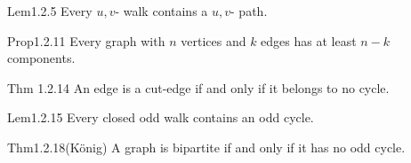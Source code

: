 \documentclass[dvipdfmx, leqno]{jsreport}
\begin{document}
\begin{soupractice}{Lem1.2.5}
    Every $u, v$- walk contains a $u, v$- path.
\end{soupractice}


\begin{soupractice}{Prop1.2.11}
    Every graph with $n$ vertices and $k$ edges has at least $n- k$ components.
\end{soupractice}

\begin{soupractice}{Thm 1.2.14}
    An edge is a cut-edge if and only if it belongs to no cycle.
\end{soupractice}

\begin{soupractice}{Lem1.2.15}
    Every closed odd walk contains an odd cycle.
\end{soupractice}

\begin{soupractice}{Thm1.2.18(K\"onig)}
    A graph is bipartite if and only if it has no odd cycle.
\end{soupractice}
\end{document}
